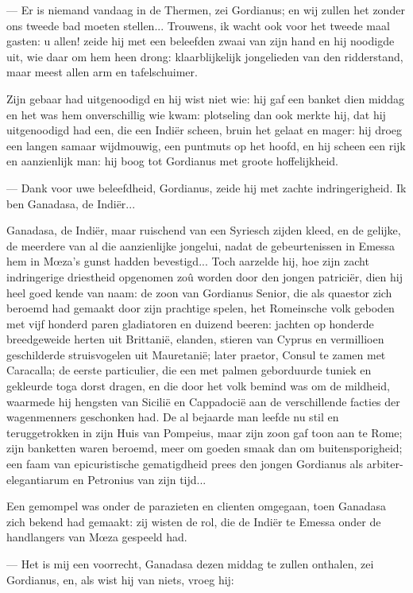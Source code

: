 \documentclass[a4paper, 12pt, oneside, dutch]{article}
\begin{document}
--- Er is niemand vandaag in de Thermen, zei Gordianus; en wij zullen het zonder ons tweede bad moeten stellen... Trouwens, ik wacht ook voor het tweede maal gasten: u allen! zeide hij met een beleefden zwaai van zijn hand en hij noodigde uit, wie daar om hem heen drong: klaarblijkelijk jongelieden van den ridderstand, maar meest allen arm en tafelschuimer.

Zijn gebaar had uitgenoodigd en hij wist niet wie: hij gaf een banket dien middag en het was hem onverschillig wie kwam: plotseling dan ook merkte hij, dat hij uitgenoodigd had een, die een Indiër scheen, bruin het gelaat en mager: hij droeg een langen samaar wijdmouwig, een puntmuts op het hoofd, en hij scheen een rijk en aanzienlijk man: hij boog tot Gordianus met groote hoffelijkheid.

--- Dank voor uwe beleefdheid, Gordianus, zeide hij met zachte indringerigheid. Ik ben Ganadasa, de Indiër...

Ganadasa, de Indiër, maar ruischend van een Syriesch zijden kleed, en de gelijke, de meerdere van al die aanzienlijke jongelui, nadat de gebeurtenissen in Emessa hem in Mœza's gunst hadden bevestigd... Toch aarzelde hij, hoe zijn zacht indringerige driestheid opgenomen zoû worden door den jongen patriciër, dien hij heel goed kende van naam: de zoon van Gordianus Senior, die als quaestor zich beroemd had gemaakt door zijn prachtige spelen, het Romeinsche volk geboden met vijf honderd paren gladiatoren en duizend beeren: jachten op honderde breedgeweide herten uit Brittanië, elanden, stieren van Cyprus en vermillioen geschilderde struisvogelen uit Mauretanië; later praetor, Consul te zamen met Caracalla; de eerste particulier, die een met palmen geborduurde tuniek en gekleurde toga dorst dragen, en die door het volk bemind was om de mildheid, waarmede hij hengsten van Sicilië en Cappadocië aan de verschillende facties der wagenmenners geschonken had. De al bejaarde man leefde nu stil en teruggetrokken in zijn Huis van Pompeius, maar zijn zoon gaf toon aan te Rome; zijn banketten waren beroemd, meer om goeden smaak dan om buitensporigheid; een faam van epicuristische gematigdheid prees den jongen Gordianus als arbiter-elegantiarum en Petronius van zijn tijd...

Een gemompel was onder de parazieten en clienten omgegaan, toen Ganadasa zich bekend had gemaakt: zij wisten de rol, die de Indiër te Emessa onder de handlangers van Mœza gespeeld had.

--- Het is mij een voorrecht, Ganadasa dezen middag te zullen onthalen, zei Gordianus, en, als wist hij van niets, vroeg hij:
\end{document}
